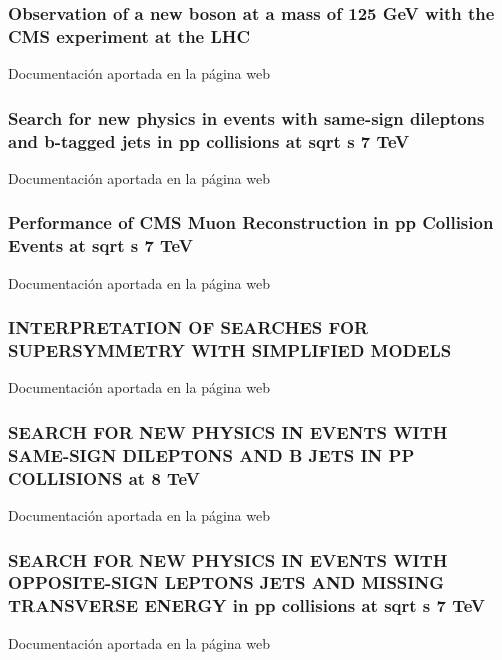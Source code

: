 \documentclass[a4paper, 11pt, twoside, openright]{report}
\begin{document}
\subsubsection{Observation of a new boson at a mass of 125 GeV with the CMS experiment at the LHC}
Documentación aportada en la página web
%
\subsubsection{Search for new physics in events with same-sign dileptons and b-tagged jets in pp collisions at sqrt s 7 TeV}
Documentación aportada en la página web
%
\subsubsection{Performance of CMS Muon Reconstruction in pp Collision Events at sqrt s 7 TeV}
Documentación aportada en la página web
%
\subsubsection{INTERPRETATION OF SEARCHES FOR SUPERSYMMETRY WITH SIMPLIFIED MODELS}
Documentación aportada en la página web
%
\subsubsection{SEARCH FOR NEW PHYSICS IN EVENTS WITH SAME-SIGN DILEPTONS AND B JETS IN PP COLLISIONS at 8 TeV}
Documentación aportada en la página web
%
\subsubsection{SEARCH FOR NEW PHYSICS IN EVENTS WITH OPPOSITE-SIGN LEPTONS JETS AND MISSING TRANSVERSE ENERGY in pp collisions at sqrt s 7 TeV}
Documentación aportada en la página web
%
\end{document}
